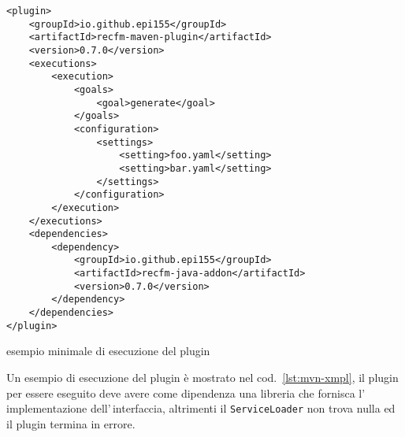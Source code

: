 \documentclass[a4paper,10pt]{report}
\newif\ifesource
\newenvironment{elisting}[1][H]
  {\captionsetup{aboveskip=0pt}\begin{listing}[#1]}
  {\end{listing}%
}
\begin{document}

\ifesource
\begin{figure*}[!htb]
\begin{lstlisting}[language=XML, caption=esempio minimale di esecuzione del 
plugin, label=lst:mvn-xmpl]
<plugin>
    <groupId>io.github.epi155</groupId>
    <artifactId>recfm-maven-plugin</artifactId>
    <version>0.7.0</version>
    <executions>
        <execution>
            <goals>
                <goal>generate</goal>
            </goals>
            <configuration>
                <settings>
                    <setting>foo.yaml</setting>
                    <setting>bar.yaml</setting>
                </settings>
            </configuration>
        </execution>
    </executions>
    <dependencies>
        <dependency>
            <groupId>io.github.epi155</groupId>
            <artifactId>recfm-java-addon</artifactId>
            <version>0.7.0</version>
        </dependency>
    </dependencies>
</plugin>
\end{lstlisting}
\end{figure*}
\else
\begin{elisting}[!htb]
\begin{verbatim}
<plugin>
    <groupId>io.github.epi155</groupId>
    <artifactId>recfm-maven-plugin</artifactId>
    <version>0.7.0</version>
    <executions>
        <execution>
            <goals>
                <goal>generate</goal>
            </goals>
            <configuration>
                <settings>
                    <setting>foo.yaml</setting>
                    <setting>bar.yaml</setting>
                </settings>
            </configuration>
        </execution>
    </executions>
    <dependencies>
        <dependency>
            <groupId>io.github.epi155</groupId>
            <artifactId>recfm-java-addon</artifactId>
            <version>0.7.0</version>
        </dependency>
    </dependencies>
</plugin>
\end{verbatim}
\caption{esempio minimale di esecuzione del plugin}
\label{lst:mvn-xmpl}
\end{elisting}
\fi
Un esempio di esecuzione del plugin è mostrato nel cod.~\ref{lst:mvn-xmpl},
il plugin per essere eseguito deve avere come dipendenza una libreria che 
fornisca l'\,implementazione dell'\,inter\-fac\-cia, altrimenti il 
\verb!ServiceLoader! non trova nulla ed il plugin termina in errore.
\end{document}
